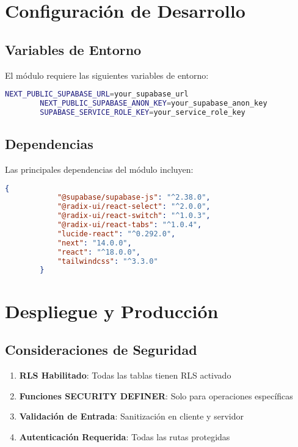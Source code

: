 \documentclass[12pt,a4paper]{article}
\begin{document}
	\section{Configuración de Desarrollo}
	
	\subsection{Variables de Entorno}
	
	El módulo requiere las siguientes variables de entorno:
	
	\begin{lstlisting}[language=bash, caption=Variables de entorno necesarias]
		NEXT_PUBLIC_SUPABASE_URL=your_supabase_url
		NEXT_PUBLIC_SUPABASE_ANON_KEY=your_supabase_anon_key
		SUPABASE_SERVICE_ROLE_KEY=your_service_role_key
	\end{lstlisting}
	
	\subsection{Dependencias}
	
	Las principales dependencias del módulo incluyen:
	
	\begin{lstlisting}[language=json, caption=Dependencias principales]
		{
			"@supabase/supabase-js": "^2.38.0",
			"@radix-ui/react-select": "^2.0.0",
			"@radix-ui/react-switch": "^1.0.3",
			"@radix-ui/react-tabs": "^1.0.4",
			"lucide-react": "^0.292.0",
			"next": "14.0.0",
			"react": "^18.0.0",
			"tailwindcss": "^3.3.0"
		}
	\end{lstlisting}
	
	\section{Despliegue y Producción}
	
	\subsection{Consideraciones de Seguridad}
	
	\begin{enumerate}
		\item \textbf{RLS Habilitado}: Todas las tablas tienen RLS activado
		\item \textbf{Funciones SECURITY DEFINER}: Solo para operaciones específicas
		\item \textbf{Validación de Entrada}: Sanitización en cliente y servidor
		\item \textbf{Autenticación Requerida}: Todas las rutas protegidas
	\end{enumerate}
	
\end{document}
